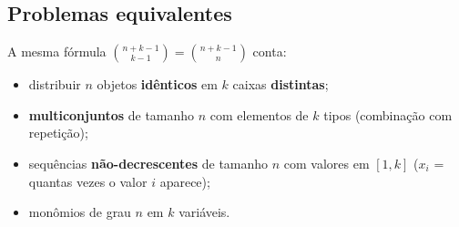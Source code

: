 \subsection*{Problemas equivalentes}

A mesma fórmula $\binom{n+k-1}{k-1} = \binom{n+k-1}{n}$ conta:
\begin{itemize}
  \item distribuir $n$ objetos \textbf{idênticos} em $k$ caixas \textbf{distintas};
  \item \textbf{multiconjuntos} de tamanho $n$ com elementos de $k$ tipos
        (combinação com repetição);
  \item sequências \textbf{não-decrescentes} de tamanho $n$ com valores em $[1, k]$
        ($x_i$ = quantas vezes o valor $i$ aparece);
  \item monômios de grau $n$ em $k$ variáveis.
\end{itemize}
